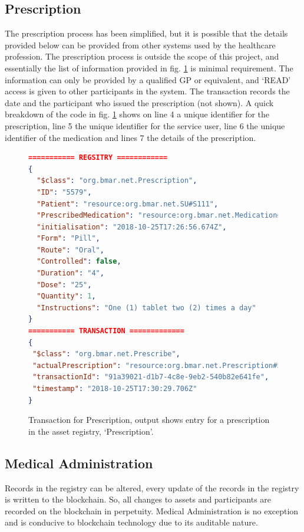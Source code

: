 \documentclass[runningheads]{llncs}
\begin{document}
\subsection{Prescription}
The prescription process has been simplified, but it is possible that the details provided below can be provided from other systems used by the healthcare profession. The prescription process is outside the scope of this project, and essentially the list of information provided in fig. \ref{fig:lst:prescription} is minimal requirement. The information can only be provided by a qualified GP or equivalent, and `READ' access is given to other participants in the system. The transaction records the date and the participant who issued the prescription (not shown). A quick breakdown of the code in fig. \ref{fig:lst:prescription} shows on line 4 a unique identifier for the prescription, line 5 the unique identifier for the service user, line 6 the unique identifier of the medication and lines 7 the details of the prescription. 
\begin{figure}
	\tiny
	\begin{lstlisting}[language=json,firstnumber=1]
=========== REGSITRY ============
{
  "$class": "org.bmar.net.Prescription",
  "ID": "5579",
  "Patient": "resource:org.bmar.net.SU#S111",
  "PrescribedMedication": "resource:org.bmar.net.Medication#111",
  "initialisation": "2018-10-25T17:26:56.674Z",
  "Form": "Pill",
  "Route": "Oral",
  "Controlled": false,
  "Duration": "4",
  "Dose": "25",
  "Quantity": 1,
  "Instructions": "One (1) tablet two (2) times a day"
}
=========== TRANSACTION =============
{
 "$class": "org.bmar.net.Prescribe",
 "actualPrescription": "resource:org.bmar.net.Prescription#5579",
 "transactionId": "91a39021-d1b7-4c8e-9eb2-540b82e641fe",
 "timestamp": "2018-10-25T17:30:29.706Z"
}
	\end{lstlisting}
	\caption{Transaction for Prescription, output shows entry for a prescription in the asset registry, `Prescription'.}
\label{fig:lst:prescription}
\end{figure}


\subsection{Medical Administration}
Records in the registry can be altered, every update of the records in the registry is written to the blockchain. So, all changes to assets and participants are recorded on the blockchain in perpetuity. Medical Administration is no exception and is conducive to blockchain technology due to its auditable nature.  
\end{document}
